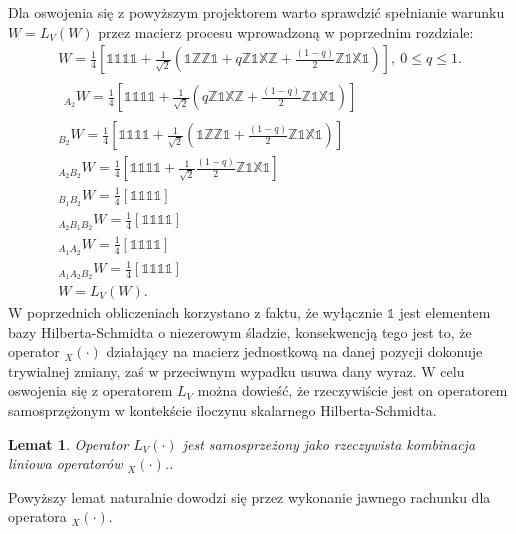 \documentclass[10pt]{article} %
\newtheorem{lm}{Lemat}
\newcommand{\X}{\mathbb{X}}
\newcommand{\Z}{\mathbb{Z}}
\newcommand{\I}{\mathbb{1}}
\begin{document}
Dla oswojenia się z powyższym projektorem warto sprawdzić spełnianie warunku $W = L_V(W)$ przez macierz procesu wprowadzoną w poprzednim rozdziale:
\begin{gather}
W = \frac{1}{4}\left[
\I\I\I\I + \frac{1}{\sqrt{2}}(\I\Z\Z\I + q\Z\I\X\Z + \frac{(1-q)}{2}\Z\I\X\I)
\right],~ 0 \leq q \leq 1. \\ 
\begin{split}
{}_{A_2} W =  \frac{1}{4}\left[
\I\I\I\I + \frac{1}{\sqrt{2}}(q\Z\I\X\Z + \frac{(1-q)}{2}\Z\I\X\I)
\right]
\end{split} \\
{}_{B_2}W =  \frac{1}{4}\left[
\I\I\I\I + \frac{1}{\sqrt{2}}(\I\Z\Z\I + \frac{(1-q)}{2}\Z\I\X\I)
\right] \\
{}_{A_2B_2}W = 
 \frac{1}{4}\left[
\I\I\I\I + \frac{1}{\sqrt{2}}\frac{(1-q)}{2}\Z\I\X\I
\right] \\
{}_{B_1B_2}W =  \frac{1}{4}\left[
\I\I\I\I
\right]\\
{}_{A_2B_1B_2}W =  \frac{1}{4}\left[
\I\I\I\I
\right]\\
{}_{A_1A_2}W =  \frac{1}{4}\left[
\I\I\I\I
\right]\\
{}_{A_1A_2B_2}W =  \frac{1}{4}\left[
\I\I\I\I
\right] \\
W = L_V(W).
\end{gather} W poprzednich obliczeniach korzystano z faktu, że wyłącznie $\I$ jest elementem bazy Hilberta-Schmidta o niezerowym śladzie, konsekwencją tego jest to, że operator ${}_X(\cdot)$ działający na macierz jednostkową na danej pozycji dokonuje trywialnej zmiany, zaś w przeciwnym wypadku usuwa dany wyraz. 
W celu oswojenia się z operatorem $L_V$ można dowieść, że rzeczywiście jest on operatorem samosprzężonym w kontekście iloczynu skalarnego Hilberta-Schmidta.
\begin{lm}
Operator $L_V(\cdot)$ jest samosprzeżony jako rzeczywista kombinacja liniowa operatorów ${}_X(\cdot)$..
\end{lm}
Powyższy lemat naturalnie dowodzi się przez wykonanie jawnego rachunku dla operatora ${}_X(\cdot)$.
\end{document}

